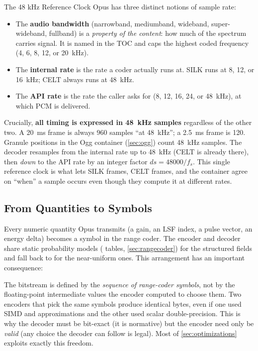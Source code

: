\begin{concept}{The 48 kHz Reference Clock}
  Opus has three distinct notions of sample rate:
  \begin{itemize}[itemsep=2pt]
    \item The \textbf{audio bandwidth} (narrowband, mediumband, wideband,
      super-wideband, fullband) is a \emph{property of the content}: how much of
      the spectrum carries signal. It is named in the TOC and caps the highest
      coded frequency (4, 6, 8, 12, or 20~kHz).
    \item The \textbf{internal rate} is the rate a coder actually runs at. SILK
      runs at 8, 12, or 16~kHz; CELT always runs at 48~kHz.
    \item The \textbf{API rate} is the rate the caller asks for (8, 12, 16,
      24, or 48~kHz), at which PCM is delivered.
  \end{itemize}

  Crucially, \textbf{all timing is expressed in 48~kHz samples} regardless of
  the other two. A 20~ms frame is always 960 samples ``at 48~kHz''; a
  2.5~ms frame is 120. Granule positions in the Ogg container
  (\cref{sec:ogg}) count 48~kHz samples. The decoder resamples from the internal
  rate up to 48~kHz (CELT is already there), then \emph{down} to the API rate by
  an integer factor $\mathit{ds} = 48000 / f_s$. This single reference clock is
  what lets SILK frames, CELT frames, and the container agree on ``when'' a
  sample occurs even though they compute it at different rates.
\end{concept}

\subsection{From Quantities to Symbols}\label{subsec:bits_overview}

Every numeric quantity Opus transmits (a gain, an LSF index, a pulse vector,
an energy delta) becomes a symbol in the range coder. The encoder and decoder
share static probability models ( tables, \cref{sec:rangecoder})
for the structured fields and fall back to  for the
near-uniform ones. This arrangement has an important consequence:

\begin{importantnote}
  The bitstream is defined by the \emph{sequence of range-coder symbols}, not
  by the floating-point intermediate values the encoder computed to choose them.
  Two encoders that pick the same symbols produce identical bytes, even if one
  used SIMD and  approximations and the other used scalar
  double-precision. This is why the decoder must be bit-exact (it is normative)
  but the encoder need only be \emph{valid} (any choice the decoder can follow
  is legal). Most of \cref{sec:optimizations} exploits exactly this freedom.
\end{importantnote}

